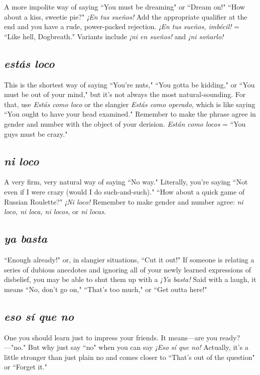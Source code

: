 A more impolite way of saying ``You must be dreaming" or
``Dream on!" ``How about a kiss, sweetie pie?" \emph{¡En tus sueños!} Add the
appropriate qualifier at the end and you have a rude, power-packed rejection. \emph{¡En tus sueños, imbécil!} = ``Like hell, Dogbreath." Variants
include \emph{¡ni en sueños!} and \emph{¡ni soñarlo!}

\subsection{\emph{estás loco}}

This is the shortest way of saying ``You're nuts," ``You gotta be
kidding," or ``You must be out of your mind," but it's not always the
most natural-sounding. For that, use \emph{Estás como loco} or the slangier
\emph{Estás como operado}, which is like saying ``You ought to have your
head examined." Remember to make the phrase agree in gender and
number with the object of your derision. \emph{Están como locos} = ``You
guys must be crazy."

\subsection{\emph{ni loco}}

A very firm, very natural way of saying ``No way." Literally,
you're saying ``Not even if I were crazy (would I do such-and-such)."
``How about a quick game of Russian Roulette?" \emph{¡Ni loco!} Remember to make gender and number agree: \emph{ni loco, ni loca, ni locos}, or
\emph{ni locas}.

\subsection{\emph{ya basta}}

``Enough already!" or, in slangier situations, ``Cut it out!" If
someone is relating a series of dubious anecdotes and ignoring all of
your newly learned expressions of disbelief, you may be able to shut
them up with a \emph{¡Ya basta!} Said with a laugh, it means ``No, don't go
on," ``That's too much," or ``Get outta here!"

\subsection{\emph{eso sí que no}}

One you should learn just to impress your friends. It means---are you ready?---"no." But why just say ``no" when you can say \emph{¡Eso sí
que no!} Actually, it's a little stronger than just plain no and comes
closer to ``That's out of the question" or ``Forget it."

